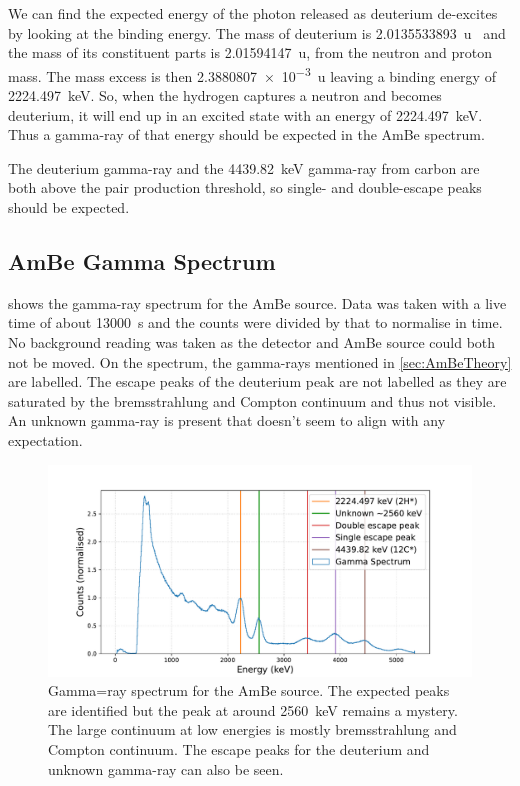 \documentclass[11pt]{article}
\numberwithin{equation}{section}
\numberwithin{figure}{section}
\numberwithin{table}{section}
\begin{document}
We can find the expected energy of the photon released as deuterium de-excites by looking at the binding energy. The mass of deuterium is \SI{2.0135533893}{u}~\cite{deuterium} and the mass of its constituent parts is \SI{2.01594147}{u}, from the neutron and proton mass. The mass excess is then \SI{2.3880807e-3}{u} leaving a binding energy of \SI{2224.497}{\kilo\electronvolt}. So, when the hydrogen captures a neutron and becomes deuterium, it will end up in an excited state with an energy of \SI{2224.497}{\kilo\electronvolt}. Thus a gamma-ray of that energy should be expected in the AmBe spectrum. 

The deuterium gamma-ray and the \SI{4439.82}{\kilo\electronvolt} gamma-ray from carbon are both above the pair production threshold, so single- and double-escape peaks should be expected. 

\subsection{AmBe Gamma Spectrum}
 shows the gamma-ray spectrum for the AmBe source. Data was taken with a live time of about \SI{13000}{\second} and the counts were divided by that to normalise in time. No background reading was taken as the detector and AmBe source could both not be moved. On the spectrum, the gamma-rays mentioned in \cref{sec:AmBeTheory} are labelled. The escape peaks of the deuterium peak are not labelled as they are saturated by the bremsstrahlung and Compton continuum and thus not visible. An unknown gamma-ray is present that doesn't seem to align with any expectation. 

\begin{figure}[h]
    \begin{center}
        \includegraphics[width=.8\textwidth]{Plots/ambe.pdf}
        \caption{Gamma=ray spectrum for the AmBe source. The expected peaks are identified but the peak at around \SI{2560}{\kilo\electronvolt} remains a mystery. The large continuum at low energies is mostly bremsstrahlung and Compton continuum. The escape peaks for the deuterium and unknown gamma-ray can also be seen.}
        \label{fig:AmBe_Spectrum}
    \end{center}
\end{figure}
\end{document}
